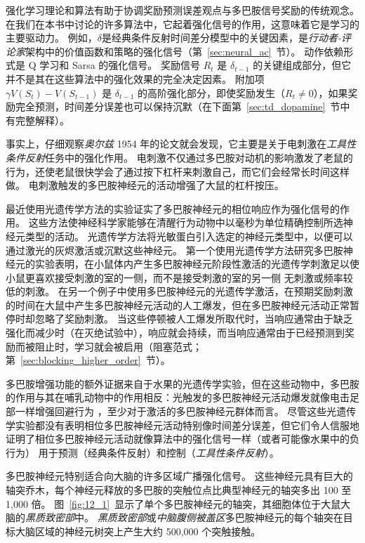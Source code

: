 强化学习理论和算法有助于协调奖励预测误差观点与多巴胺信号奖励的传统观念。
在我们在本书中讨论的许多算法中，它起着强化信号的作用，这意味着它是学习的主要驱动力。
例如，$ \delta $是经典条件反射时间差分模型中的关键因素，是\textit{行动者-评论家}架构中的价值函数和策略的强化信号（第~\ref{sec:neural_ac}~节）。
动作依赖形式是 Q 学习和 Sarsa 的强化信号。
奖励信号 $ R_t $ 是 $ \delta_{t-1} $ 的关键组成部分，但它并不是其在这些算法中的强化效果的完全决定因素。
附加项 $ \gamma V(S_t) - V(S_{t-1}) $ 是 $ \delta_{t-1} $ 的高阶强化部分，即使奖励发生（$ R_t \neq 0 $），如果奖励完全预测，时间差分误差也可以保持沉默（在下面第~\ref{sec:td_dopamine}~节中有完整解释）。


事实上，仔细观察\textit{奥尔兹} 1954 年的论文就会发现，它主要是关于电刺激在\textit{工具性条件反射}任务中的强化作用。
电刺激不仅通过多巴胺对动机的影响激发了老鼠的行为，还使老鼠很快学会了通过按下杠杆来刺激自己，而它们会经常长时间这样做。
电刺激触发的多巴胺神经元的活动增强了大鼠的杠杆按压。


最近使用光遗传学方法的实验证实了多巴胺神经元的相位响应作为强化信号的作用。
这些方法使神经科学家能够在清醒行为动物中以毫秒为单位精确控制所选神经元类型的活动。
光遗传学方法将光敏蛋白引入选定的神经元类型中，以便可以通过激光的灰烬激活或沉默这些神经元。
第一个使用光遗传学方法研究多巴胺神经元的实验表明，在小鼠体内产生多巴胺神经元阶段性激活的光遗传学刺激足以使小鼠更喜欢接受刺激的室的一侧，而不是接受刺激的室的另一侧 无刺激或频率较低的刺激\cite{tsai2009phasic}。
在另一个例子中\cite{steinberg2013causal}使用多巴胺神经元的光遗传学激活，在预期奖励刺激的时间在大鼠中产生多巴胺神经元活动的人工爆发，但在多巴胺神经元活动正常暂停时却忽略了奖励刺激。
当这些停顿被人工爆发所取代时，当响应通常由于缺乏强化而减少时（在灭绝试验中），响应就会持续，而当响应通常由于已经预测到奖励而被阻止时，学习就会被启用（阻塞范式； 第~\ref{sec:blocking_higher_order}~节）。


多巴胺增强功能的额外证据来自于水果的光遗传学实验，但在这些动物中，多巴胺的作用与其在哺乳动物中的作用相反：光触发的多巴胺神经元活动爆发就像电击足部一样增强回避行为 ，至少对于激活的多巴胺神经元群体而言\cite{claridge2009writing}。
尽管这些光遗传学实验都没有表明相位多巴胺神经元活动特别像时间差分误差，但它们令人信服地证明了相位多巴胺神经元活动就像算法中的强化信号一样（或者可能像水果中的负行为） 用于预测（经典条件反射）和控制（\textit{工具性条件反射}）。


多巴胺神经元特别适合向大脑的许多区域广播强化信号。
这些神经元具有巨大的轴突乔木，每个神经元释放的多巴胺的突触位点比典型神经元的轴突多出 100 至 1,000 倍。
图~\ref{fig:12_1}~显示了单个多巴胺神经元的轴突，其细胞体位于大鼠大脑的\textit{黑质致密部}中。
\textit{黑质致密部}或\textit{中脑腹侧被盖区}多巴胺神经元的每个轴突在目标大脑区域的神经元树突上产生大约 500,000 个突触接触。



